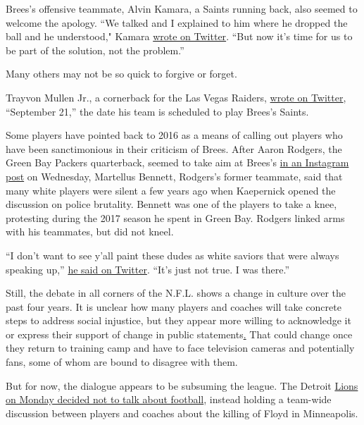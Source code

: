 Brees's offensive teammate, Alvin Kamara, a Saints running back, also
seemed to welcome the apology. ``We talked and I explained to him where
he dropped the ball and he understood," Kamara
\href{https://twitter.com/A_kamara6/status/1268623227103911943}{wrote on
Twitter}. ``But now it's time for us to be part of the solution, not the
problem.''

Many others may not be so quick to forgive or forget.

Trayvon Mullen Jr., a cornerback for the Las Vegas Raiders,
\href{https://twitter.com/MullenIsland1}{wrote on Twitter}, ``September
21,'' the date his team is scheduled to play Brees's Saints.

Some players have pointed back to 2016 as a means of calling out players
who have been sanctimonious in their criticism of Brees. After Aaron
Rodgers, the Green Bay Packers quarterback, seemed to take aim at
Brees's \href{https://www.instagram.com/p/CA_Mq6ip8J6/}{in an Instagram
post} on Wednesday, Martellus Bennett, Rodgers's former teammate, said
that many white players were silent a few years ago when Kaepernick
opened the discussion on police brutality. Bennett was one of the
players to take a knee, protesting during the 2017 season he spent in
Green Bay. Rodgers linked arms with his teammates, but did not kneel.

``I don't want to see y'all paint these dudes as white saviors that were
always speaking up,''
\href{https://twitter.com/MartysaurusRex/status/1268399925982670848}{he
said on Twitter}. ``It's just not true. I was there.''

Still, the debate in all corners of the N.F.L. shows a change in culture
over the past four years. It is unclear how many players and coaches
will take concrete steps to address social injustice, but they appear
more willing to acknowledge it or express their support of change in
public
statements\href{https://www.espn.com/nfl/story/_/id/29263075/broncos-coach-vic-fangio-apologizes-comments-see-racism-all-nfl}{.}
That could change once they return to training camp and have to face
television cameras and potentially fans, some of whom are bound to
disagree with them.

But for now, the dialogue appears to be subsuming the league. The
Detroit
\href{https://www.si.com/nfl/2020/06/03/nfl-mailbag-matt-patricia-detroit-lions-george-floyd}{Lions
on Monday decided not to talk about football}, instead holding a
team-wide discussion between players and coaches about the killing of
Floyd in Minneapolis.

